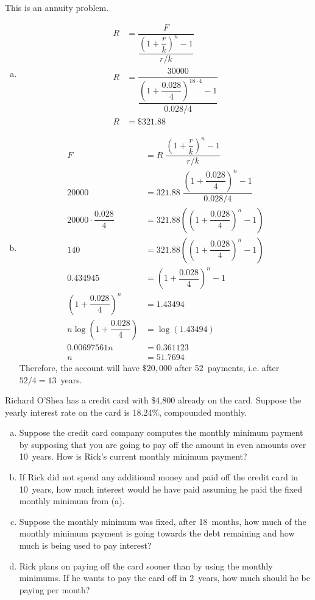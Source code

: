 \documentclass[11pt,letterpaper]{article}
\begin{document}
\sol This is an annuity problem.
\begin{enumerate}[(a)]
\item 
	\[
	\begin{aligned}
	R&= \dfrac{F}{\dfrac{\left(1 + \dfrac{r}{k} \right)^n - 1}{r/k}} \\
	R&= \dfrac{30000}{\dfrac{\left(1 + \dfrac{0.028}{4} \right)^{18 \cdot 4} - 1}{0.028/4}} \\
	R&= \$321.88
	\end{aligned}
	\] \pspace

\item 
	\[
	\begin{aligned}
	F&= R \; \dfrac{\left(1 + \dfrac{r}{k} \right)^n - 1}{r/k} \\
	20000&= 321.88 \; \dfrac{\left(1 + \dfrac{0.028}{4} \right)^n - 1}{0.028/4} \\
	20000 \cdot \dfrac{0.028}{4}&= 321.88 \left( \left(1 + \dfrac{0.028}{4} \right)^n - 1 \right) \\
	140&= 321.88 \left( \left(1 + \dfrac{0.028}{4} \right)^n - 1 \right) \\
	0.434945&= \left(1 + \dfrac{0.028}{4} \right)^n - 1 \\
	\left(1 + \dfrac{0.028}{4} \right)^n&= 1.43494 \\
	n \log\left(1 + \dfrac{0.028}{4} \right)&= \log(1.43494) \\
	0.00697561n&= 0.361123 \\
	n&= 51.7694
	\end{aligned}
	\]
Therefore, the account will have $\$20,000$ after 52~payments, i.e. after $52/4= 13$~years.
\end{enumerate}





\newpage





 Richard O'Shea has a credit card with \$4,800 already on the card. Suppose the yearly interest rate on the card is 18.24\%, compounded monthly. 
\begin{enumerate}[(a)]
\item Suppose the credit card company computes the monthly minimum payment by supposing that you are going to pay off the amount in even amounts over 10~years. How is Rick's current monthly minimum payment?
\item If Rick did not spend any additional money and paid off the credit card in 10~years, how much interest would he have paid assuming he paid the fixed monthly minimum from (a).
\item Suppose the monthly minimum was fixed, after 18~months, how much of the monthly minimum payment is going towards the debt remaining and how much is being used to pay interest?
\item Rick plans on paying off the card sooner than by using the monthly minimums. If he wants to pay the card off in 2~years, how much should he be paying per month?
\end{enumerate} 
\end{document}

